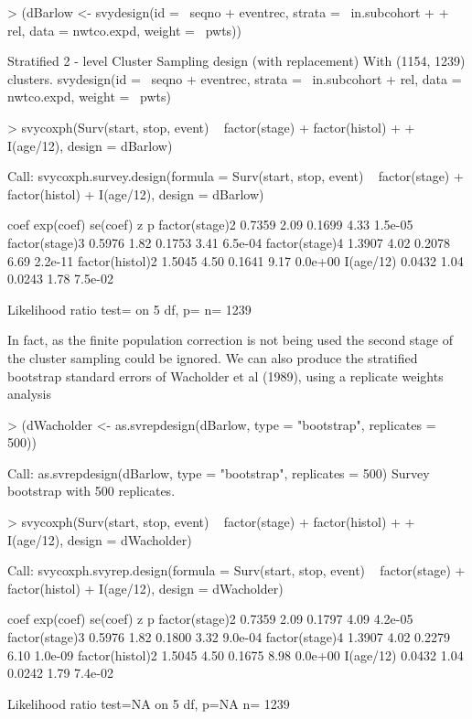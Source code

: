 \documentclass{article}
\begin{document}
\begin{Schunk}
\begin{Sinput}
> (dBarlow <- svydesign(id = ~seqno + eventrec, strata = ~in.subcohort + 
+     rel, data = nwtco.expd, weight = ~pwts))
\end{Sinput}
\begin{Soutput}
Stratified 2 - level Cluster Sampling design (with replacement)
With (1154, 1239) clusters.
svydesign(id = ~seqno + eventrec, strata = ~in.subcohort + rel, 
    data = nwtco.expd, weight = ~pwts)
\end{Soutput}
\begin{Sinput}
> svycoxph(Surv(start, stop, event) ~ factor(stage) + factor(histol) + 
+     I(age/12), design = dBarlow)
\end{Sinput}
\begin{Soutput}
Call:
svycoxph.survey.design(formula = Surv(start, stop, event) ~ factor(stage) + 
    factor(histol) + I(age/12), design = dBarlow)


                  coef exp(coef) se(coef)    z       p
factor(stage)2  0.7359      2.09   0.1699 4.33 1.5e-05
factor(stage)3  0.5976      1.82   0.1753 3.41 6.5e-04
factor(stage)4  1.3907      4.02   0.2078 6.69 2.2e-11
factor(histol)2 1.5045      4.50   0.1641 9.17 0.0e+00
I(age/12)       0.0432      1.04   0.0243 1.78 7.5e-02

Likelihood ratio test=  on 5 df, p=  n= 1239 
\end{Soutput}
\end{Schunk}

In fact, as the finite population correction is not being used the second stage of the cluster sampling could be ignored.   We can also produce the stratified bootstrap standard errors of Wacholder et al (1989), using a replicate weights analysis

\begin{Schunk}
\begin{Sinput}
> (dWacholder <- as.svrepdesign(dBarlow, type = "bootstrap", replicates = 500))
\end{Sinput}
\begin{Soutput}
Call: as.svrepdesign(dBarlow, type = "bootstrap", replicates = 500)
Survey bootstrap with 500 replicates.
\end{Soutput}
\begin{Sinput}
> svycoxph(Surv(start, stop, event) ~ factor(stage) + factor(histol) + 
+     I(age/12), design = dWacholder)
\end{Sinput}
\begin{Soutput}
Call:
svycoxph.svyrep.design(formula = Surv(start, stop, event) ~ factor(stage) + 
    factor(histol) + I(age/12), design = dWacholder)


                  coef exp(coef) se(coef)    z       p
factor(stage)2  0.7359      2.09   0.1797 4.09 4.2e-05
factor(stage)3  0.5976      1.82   0.1800 3.32 9.0e-04
factor(stage)4  1.3907      4.02   0.2279 6.10 1.0e-09
factor(histol)2 1.5045      4.50   0.1675 8.98 0.0e+00
I(age/12)       0.0432      1.04   0.0242 1.79 7.4e-02

Likelihood ratio test=NA  on 5 df, p=NA  n= 1239 
\end{Soutput}
\end{Schunk}
\end{document}
